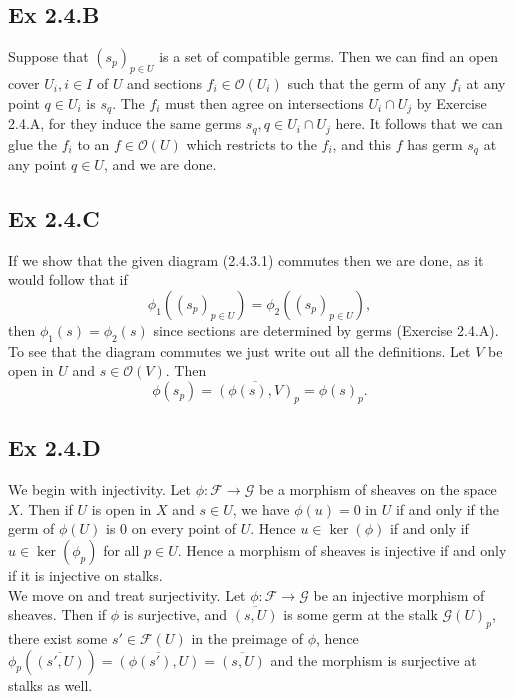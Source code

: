 \documentclass{article}
\theoremstyle{definition}
\begin{document}
\subsection*{Ex 2.4.B}

Suppose that $(s_p)_{p \in U}$ is a set of compatible germs. Then we can find
an open cover $U_i,i \in I$ of $U$ and sections $f_i \in \mathcal{O}(U_i)$ such
that the germ of any $f_i$ at any point $q \in U_i$ is $s_q$. The $f_i$ must
then agree on intersections $U_i \cap U_j$ by Exercise 2.4.A, for they induce
the same germs $s_q, q \in U_i \cap U_j$ here. It follows that we can glue the
$f_i$ to an $f \in \mathcal{O}(U)$ which restricts to the $f_i$, and this $f$
has germ $s_q$ at any point $q \in U$, and we are done.

\subsection*{Ex 2.4.C}

If we show that the given diagram (2.4.3.1) commutes then we are done, as it
would follow that if
\[
	\phi_1((s_p)_{p \in U})
	=
	\phi_2((s_p)_{p \in U}),
\]
then $\phi_1(s) = \phi_2(s)$ since sections are determined by germs (Exercise
2.4.A). \\

To see that the diagram commutes we just write out all the definitions. Let $V$
be open in $U$ and $s \in \mathcal{O}(V)$. Then 
\[
	\phi(s_p)
	=
	\overline{(\phi(s), V)}_p
	=
	\phi(s)_p.
\] 

\subsection*{Ex 2.4.D}

We begin with injectivity. Let $\phi : \mathcal{F} \to \mathcal{G}$ be a
morphism of sheaves on the space $X$. Then if $U$ is open in $X$ and $s \in U$,
we have $\phi(u) = 0$ in $U$ if and only if the germ of $\phi(U)$ is $0$ on
every point of $U$. Hence $u \in \ker(\phi)$ if and only if $u \in
\ker(\phi_p)$ for all $p \in U$. Hence a morphism of sheaves is injective if
and only if it is injective on stalks. \\

We move on and treat surjectivity. Let $\phi : \mathcal{F} \to \mathcal{G}$ be
an injective morphism of sheaves. Then if $\phi$ is surjective, and
$\overline{(s, U)}$ is some germ at the stalk $\mathcal{G}(U)_{p}$, there exist
some $s' \in \mathcal{F}(U)$ in the preimage of $\phi$, hence
$\phi_p(\overline{(s', U)}) = \overline{(\phi(s'), U)} = \overline{(s, U)}$ and
the morphism is surjective at stalks as well. \\
\end{document}
